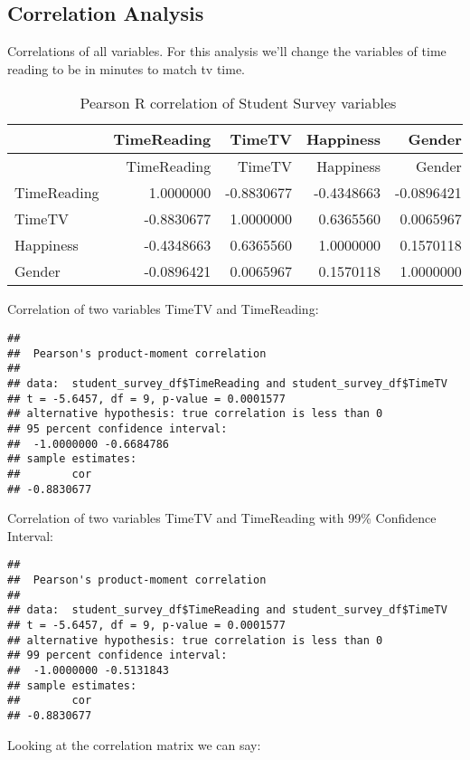 \documentclass[
]{article}
\begin{document}
\hypertarget{correlation-analysis}{%
\subsection{Correlation Analysis}\label{correlation-analysis}}

Correlations of all variables. For this analysis we'll change the
variables of time reading to be in minutes to match tv time.

\begin{longtable}[]{@{}lrrrr@{}}
\caption{Pearson R correlation of Student Survey
variables}\tabularnewline
\toprule
& TimeReading & TimeTV & Happiness & Gender \\
\midrule
\endfirsthead
\toprule
& TimeReading & TimeTV & Happiness & Gender \\
\midrule
\endhead
TimeReading & 1.0000000 & -0.8830677 & -0.4348663 & -0.0896421 \\
TimeTV & -0.8830677 & 1.0000000 & 0.6365560 & 0.0065967 \\
Happiness & -0.4348663 & 0.6365560 & 1.0000000 & 0.1570118 \\
Gender & -0.0896421 & 0.0065967 & 0.1570118 & 1.0000000 \\
\bottomrule
\end{longtable}

Correlation of two variables TimeTV and TimeReading:

\begin{verbatim}
## 
##  Pearson's product-moment correlation
## 
## data:  student_survey_df$TimeReading and student_survey_df$TimeTV
## t = -5.6457, df = 9, p-value = 0.0001577
## alternative hypothesis: true correlation is less than 0
## 95 percent confidence interval:
##  -1.0000000 -0.6684786
## sample estimates:
##        cor 
## -0.8830677
\end{verbatim}

Correlation of two variables TimeTV and TimeReading with 99\% Confidence
Interval:

\begin{verbatim}
## 
##  Pearson's product-moment correlation
## 
## data:  student_survey_df$TimeReading and student_survey_df$TimeTV
## t = -5.6457, df = 9, p-value = 0.0001577
## alternative hypothesis: true correlation is less than 0
## 99 percent confidence interval:
##  -1.0000000 -0.5131843
## sample estimates:
##        cor 
## -0.8830677
\end{verbatim}

Looking at the correlation matrix we can say:
\end{document}
